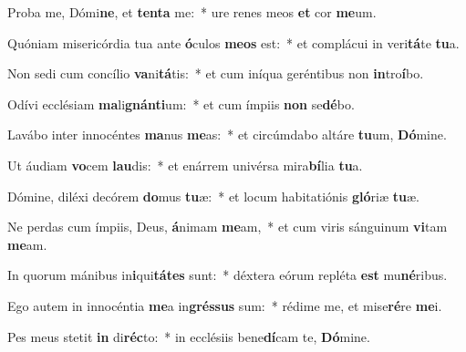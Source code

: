\item Proba me, Dómi\textbf{ne}, et \textbf{ten}\textbf{ta} me:~* ure renes meos \textbf{et} cor \textbf{me}um.
\item Quóniam misericórdia tua ante \textbf{ó}culos \textbf{me}\textbf{os} est:~* et complácui in veri\textbf{tá}te \textbf{tu}a.
\item Non sedi cum concílio \textbf{va}ni\textbf{tá}tis:~* et cum iníqua geréntibus non \textbf{in}tro\textbf{í}bo.
\item Odívi ecclésiam \textbf{ma}li\textbf{gnán}\textbf{ti}um:~* et cum ímpiis \textbf{non} se\textbf{dé}bo.
\item Lavábo inter innocéntes \textbf{ma}nus \textbf{me}as:~* et circúmdabo altáre \textbf{tu}um, \textbf{Dó}mine.
\item Ut áudiam \textbf{vo}cem \textbf{lau}dis:~* et enárrem univérsa mira\textbf{bí}lia \textbf{tu}a.
\item Dómine, diléxi decórem \textbf{do}mus \textbf{tu}æ:~* et locum habitatiónis \textbf{gló}riæ \textbf{tu}æ.
\item Ne perdas cum ímpiis, Deus, \textbf{á}nimam \textbf{me}am,~* et cum viris sánguinum \textbf{vi}tam \textbf{me}am.
\item In quorum mánibus in\textbf{i}qui\textbf{tá}\textbf{tes} sunt:~* déxtera eórum repléta \textbf{est} mu\textbf{né}ribus.
\item Ego autem in innocéntia \textbf{me}a in\textbf{grés}\textbf{sus} sum:~* rédime me, et mise\textbf{ré}re \textbf{me}i.
\item Pes meus stetit \textbf{in} di\textbf{réc}to:~* in ecclésiis bene\textbf{dí}cam te, \textbf{Dó}mine.
